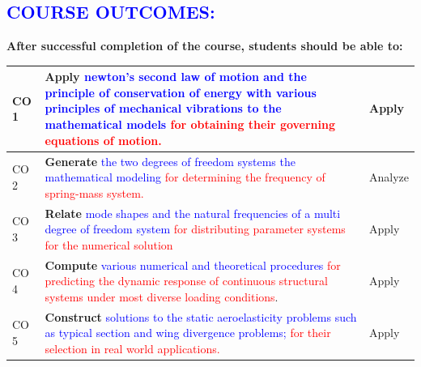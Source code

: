 \documentclass[11pt]{exam}
\begin{document}
\textcolor{blue}{\section{\large \bfseries COURSE OUTCOMES:}}
\vspace{-0.3cm}	
\textbf{After successful completion of the course, students should be able to:}\\
\renewcommand{\arraystretch}{1.1}\vspace{-0.75cm}
\begin{flushleft}
	\begin{longtable}{|C{1.5cm}|R{12.5cm}|C{2cm}|}
		\hline
		CO 1 &	\textbf{Apply} \textcolor{blue}{ newton's second law of motion and the principle of conservation of energy with various principles of mechanical vibrations  to the mathematical models  } \textcolor{red}{for obtaining
			their governing equations of motion.}&Apply\tabularnewline
		\hline
		CO 2&	\textbf{Generate} \textcolor{blue}{   the two degrees of
			freedom systems the mathematical modeling } \textcolor{red}{ for determining the frequency of spring-mass system.}&	Analyze\tabularnewline
		\hline
		CO 3&	\textbf{Relate} \textcolor{blue}{ mode shapes and  the natural frequencies   of a multi	degree of freedom system } \textcolor{red}{ for distributing parameter systems for the numerical solution }&	Apply\tabularnewline
		\hline 
	
		CO 4&	\textbf{Compute} \textcolor{blue}{  various numerical and theoretical  procedures } \textcolor{red}{for predicting the dynamic response of  continuous structural systems under most diverse loading conditions}.	&Apply\tabularnewline
		\hline		
		CO 5&\textbf{Construct } \textcolor{blue}{ solutions to the static aeroelasticity problems such as typical section and wing divergence
			problems; }\textcolor{red}{ for their selection in real world
			applications.}	&	Apply\tabularnewline
		
		
		\hline
	\end{longtable}
\end{flushleft}
\end{document}
